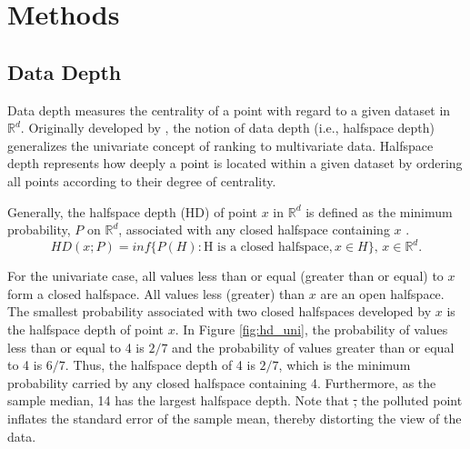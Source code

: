 \documentclass[a4paper,UKenglish]{lipics-v2018}
\providecommand{\DIFdel}[1]{{\protect\color{red}\sout{#1}}}                      %
\providecommand{\DIFdelbegin}{} %
\providecommand{\DIFdelend}{} %
\begin{document}

\DIFdelend \section{Methods}
\label{sec:methods}

\subsection{Data Depth}
Data depth measures the centrality of a point with regard to a given dataset in $\mathbb{R}^d$.
Originally developed by \cite{tukey75ICM}, the notion of data depth (i.e., halfspace depth) generalizes the univariate concept of ranking to multivariate data.
Halfspace depth represents how deeply a point is located within a given dataset by ordering all points according to their degree of centrality. 

Generally, the halfspace depth (HD) of point $x$ in $\mathbb{R}^d$ is defined as the minimum probability, $P$ on $\mathbb{R}^d$, associated with any closed halfspace containing $x$ \cite{liu00AS}. 
\begin{equation*}\label{eq:hd}
HD(x;P) = inf\{P(H): \text{H is a closed halfspace}, x \in H\}\text{, } x \in \mathbb{R}^d.
\end{equation*}

For the univariate case, all values less than or equal (greater than or equal) to $x$ form a closed halfspace.
All values less (greater) than $x$ are an open halfspace.
The smallest probability associated with two closed halfspaces developed by $x$ is the halfspace depth of point $x$.
In Figure \ref{fig:hd_uni}, the probability of values less than or equal to 4 is $2/7$ and the probability of values greater than or equal to 4 is $6/7$.
Thus, the halfspace depth of 4 is $2/7$, which is the minimum probability carried by any closed halfspace containing 4.
Furthermore, as the sample median, 14 has the largest halfspace depth.
Note that \DIFdelbegin \DIFdel{, }\DIFdelend the polluted point inflates the standard error of the sample mean, thereby distorting the view of the data. 
\end{document}
